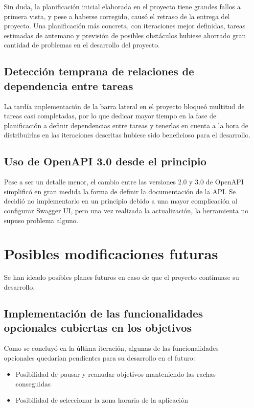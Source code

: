 \documentclass[10pt, a4paper]{aqademic}
\begin{document}
Sin duda, la planificación inicial elaborada en el proyecto tiene grandes fallos a primera vista, y pese a haberse corregido, causó el retraso de la entrega del proyecto.
Una planificación más concreta, con iteraciones mejor definidas, tareas estimadas de antemano y previsión de posibles obstáculos hubiese ahorrado gran cantidad de problemas en el desarrollo del proyecto.


\subsection{Detección temprana de relaciones de dependencia entre tareas}

La tardía implementación de la barra lateral en el proyecto bloqueó multitud de tareas casi completadas, por lo que dedicar mayor tiempo en la fase de planificación a definir dependencias entre tareas y tenerlas en cuenta a la hora de distribuirlas en las iteraciones descritas hubiese sido beneficioso para el desarrollo.


\subsection*{Uso de OpenAPI 3.0 desde el principio}

Pese a ser un detalle menor, el cambio entre las versiones 2.0 y 3.0 de OpenAPI simplificó en gran medida la forma de definir la documentación de la API. Se decidió no implementarlo en un principio debido a una mayor complicación al configurar Swagger UI, pero una vez realizada la actualización, la herramienta no supuso problema alguno.


\section{Posibles modificaciones futuras}

Se han ideado posibles planes futuros en caso de que el proyecto continuase su desarrollo.

\subsection*{Implementación de las funcionalidades opcionales cubiertas en los objetivos}

Como se concluyó en la última iteración, algunas de las funcionalidades opcionales quedarían pendientes para su desarrollo en el futuro:

\begin{itemize}
	\item Posibilidad de pausar y reanudar objetivos manteniendo las rachas conseguidas
	\item Posibilidad de seleccionar la zona horaria de la aplicación
\end{itemize}
\end{document}
